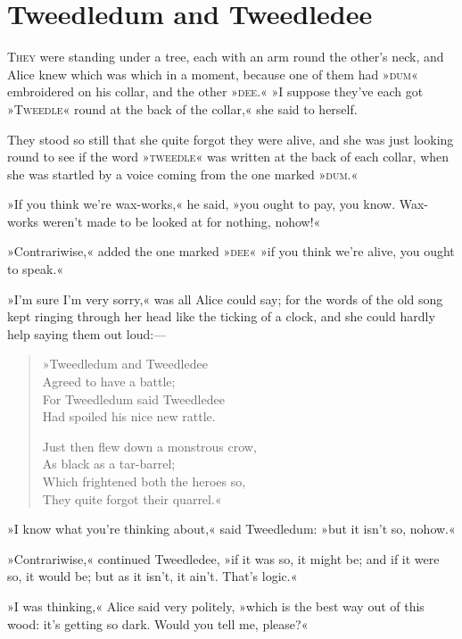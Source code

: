 \chapter{Tweedledum and Tweedledee}

\label{white2b}
\lettrine[lines=4]{T}{hey} were standing under a tree, each with an arm round the other's neck, and Alice knew which was which in a moment, because one of them had »\textsc{dum}« embroidered on his collar, and the other »\textsc{dee}.« »I suppose they've each got »\textsc{Tweedle}« round at the back of the collar,« she said to herself.

They stood so still that she quite forgot they were alive, and she was just looking round to see if the word »\textsc{tweedle}« was written at the back of each collar, when she was startled by a voice coming from the one marked »\textsc{dum}.«

»If you think we're wax-works,« he said, »you ought to pay, you know. Wax-works weren't made to be looked at for nothing, nohow!«

»Contrariwise,« added the one marked »\textsc{dee}« »if you think we're alive, you ought to speak.«

»I'm sure I'm very sorry,« was all Alice could say; for the words of the old song kept ringing through her head like the ticking of a clock, and she could hardly help saying them out loud:—

\begin{verse}
»Tweedledum and Tweedledee\\
\vin Agreed to have a battle;\\
For Tweedledum said Tweedledee\\
\vin Had spoiled his nice new rattle.

Just then flew down a monstrous crow,\\
\vin As black as a tar-barrel;\\
Which frightened both the heroes so,\\
\vin They quite forgot their quarrel.«
\end{verse}

»I know what you're thinking about,« said Tweedledum: »but it isn't so, nohow.«

»Contrariwise,« continued Tweedledee, »if it was so, it might be; and if it were so, it would be; but as it isn't, it ain't. That's logic.«

»I was thinking,« Alice said very politely, »which is the best way out of this wood: it's getting so dark. Would you tell me, please?«

